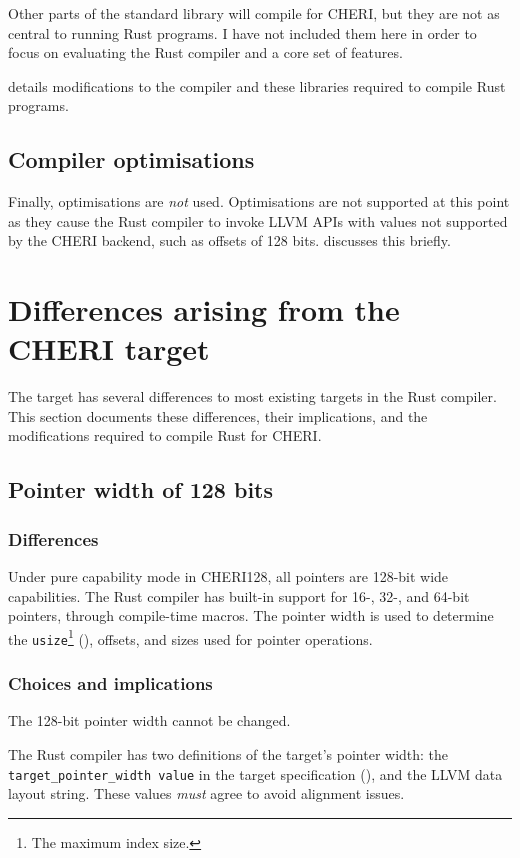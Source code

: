 \documentclass[dissertation.tex]{subfiles}
\begin{document}
Other parts of the standard library will compile for CHERI, but they are
not as central to running Rust programs.
I have not included them here in order to focus on evaluating the Rust
compiler and a core set of features.

 details modifications to the compiler and
these libraries required to compile Rust programs.

\subsection{Compiler optimisations}
Finally, optimisations are \emph{not} used.
Optimisations are not supported at this point as they cause the Rust
compiler to invoke LLVM APIs with values not supported by the CHERI
backend, such as offsets of 128 bits.
 discusses this briefly.


\section{Differences arising from the CHERI target}
\label{sec:impl-divergences}

The \cuf target has several differences to most existing targets in the
Rust compiler.
This section documents these differences, their implications, and the
modifications required to compile Rust for CHERI.


\subsection{Pointer width of 128 bits}
\label{sec:impl-width}

\subsubsection{Differences}
Under pure capability mode in CHERI128, all pointers are 128-bit wide
capabilities.
The Rust compiler has built-in support for 16-, 32-, and 64-bit
pointers, through compile-time macros.
The pointer width is used to determine the \texttt{usize}\footnote{The
maximum index size.} (), offsets, and sizes used
for pointer operations.

\subsubsection{Choices and implications}
The 128-bit pointer width cannot be changed.

The Rust compiler has two definitions of the target's pointer width: the
\texttt{target\_pointer\_width value} in the target specification
(), and the LLVM data layout string.
These values \emph{must} agree to avoid alignment issues.
\end{document}
